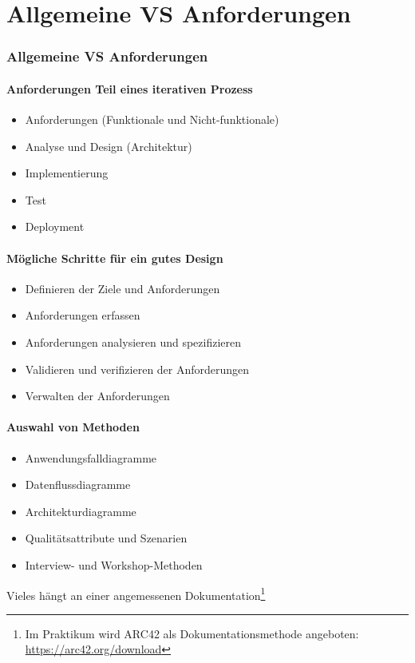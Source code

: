 \section{Allgemeine VS Anforderungen}
\begin{frame}
  \frametitle{Allgemeine VS Anforderungen}
  \framesubtitle{Anforderungen Teil eines iterativen Prozess}
  \begin{itemize}
    \item Anforderungen (Funktionale und Nicht-funktionale)
    \item Analyse und Design (Architektur)
    \item Implementierung
    \item Test
    \item Deployment
  \end{itemize}
\end{frame}



\begin{frame}
  \framesubtitle{Mögliche Schritte für ein gutes Design}
  \begin{itemize}
    \item Definieren der Ziele und Anforderungen
    \item Anforderungen erfassen
    \item Anforderungen analysieren und spezifizieren
    \item Validieren und verifizieren der Anforderungen
    \item Verwalten der Anforderungen
  \end{itemize}
\end{frame}


\begin{frame}
  \framesubtitle{Auswahl von Methoden}
  \begin{itemize}
    \item Anwendungsfalldiagramme
    \item Datenflussdiagramme
    \item Architekturdiagramme
    \item Qualitätsattribute und Szenarien
    \item Interview- und Workshop-Methoden
  \end{itemize}
  Vieles hängt an einer angemessenen Dokumentation\footnote{Im Praktikum wird ARC42 als Dokumentationsmethode angeboten: \url{https://arc42.org/download}}
\end{frame}
